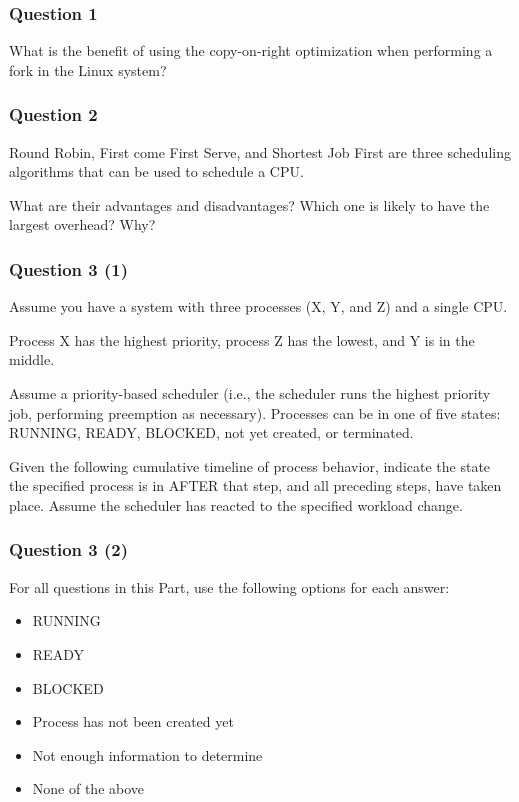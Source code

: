   \begin{frame}
    \frametitle{Question 1}

    What is the benefit of using the copy-on-right optimization when performing
    a fork in the Linux system? 
  \end{frame}

  \begin{frame}
    \frametitle{Question 2}

    Round Robin, First come First Serve, and Shortest Job First are three
    scheduling algorithms that can be used to schedule a CPU.

    \vspace{2em}

    What are their advantages and disadvantages? Which one is likely to have the
    largest overhead? Why?
  \end{frame}

  \begin{frame}
    \frametitle{Question 3 (1)}

    Assume you have a system with three processes (X, Y, and Z) and a single
    CPU.

    Process X has the highest priority, process Z has the lowest, and Y is in
    the middle.

    \vspace{2em}

    Assume a priority-based scheduler (i.e., the scheduler runs the highest
    priority job, performing preemption as necessary).
    Processes can be in one of five states: RUNNING, READY, BLOCKED, not yet
    created, or terminated.

    \vspace{2em}

    Given the following cumulative timeline of process behavior, indicate the
    state the specified process is in AFTER that step, and all preceding steps,
    have taken place. Assume the scheduler has reacted to the specified
    workload change.
  \end{frame}

  \begin{frame}
    \frametitle{Question 3 (2)}

    For all questions in this Part, use the following options for each answer:
    \begin{itemize}
      \item RUNNING
      \item READY
      \item BLOCKED
      \item Process has not been created yet
      \item Not enough information to determine
      \item None of the above
    \end{itemize}
  \end{frame}

